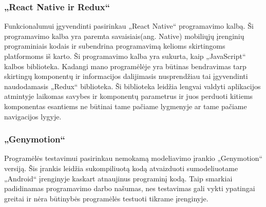 \documentclass[a4paper,12pt,fleqn]{article}
\begin{document}
\subsubsection{„React Native ir Redux“}
Funkcionalumui įgyvendinti pasirinkau „React Native“ programavimo kalbą. Ši programavimo kalba yra paremta savaisiais(ang. Native) mobiliųjų įrenginių programiniais kodais ir subendrina programavimą kelioms skirtingoms platformoms iš karto. Ši programavimo kalba yra sukurta, kaip „JavaScript“ kalbos biblioteka. Kadangi mano programėlėje yra būtinas bendravimas tarp skirtingų komponentų ir informacijos dalijimasis nusprendžiau tai įgyvendinti naudodamasis „Redux“ biblioteka. Ši biblioteka leidžia lengvai valdyti aplikacijos atmintyje laikomas savybes ir komponentų parametrus ir juos perduoti kitiems komponentas esantiems ne būtinai tame pačiame lygmenyje ar tame pačiame navigacijos lygyje.
\subsubsection{„Genymotion“}
Programėlės testavimui pasirinkau nemokamą modeliavimo įrankio „Genymotion“ versiją. Šis įrankis leidžia sukompiliuotą kodą atvaizduoti sumodeliuotame „Android“ įrenginyje kaskart atnaujinus programinį kodą. Taip smarkiai padidinamas programavimo darbo našumas, nes testavimas gali vykti ypatingai greitai ir nėra būtinybės programėlės testuoti tikrame įrenginyje.
\end{document}

